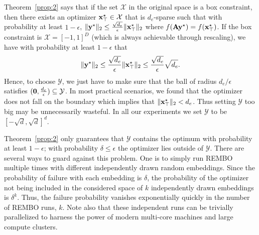 \documentclass{article}
\newcommand{\note}[1]{}
\renewcommand{\note}[1]{~\\\frame{\begin{minipage}[c]{0.48\textwidth}\vspace{2pt}\center{#1}\vspace{2pt}\end{minipage}}\vspace{3pt}\\}
\begin{document}
Theorem~\ref{prop:2} says that if the set $\mathcal{X}$ in the original space is a box constraint, then there exists an optimizer $\mathbf{x}^\star_\top \in \mathcal{X}$ that is $d_e$-sparse such that with probability at least $1-\epsilon$, $\|\mathbf{y}^\star\|_2 \leq \frac{\sqrt{d_e}}{\epsilon}\|\mathbf{x}^{\star}_\top\|_2$ where $f(\mathbf{A}\mathbf{y}^\star) = f(\mathbf{x}^\star_\top)$. If the box constraint is $\mathcal{X} = [-1,1]^D$ (which is always achievable through rescaling), we have with probability at least $1-\epsilon$ that 
\[ \|\mathbf{y}^\star\|_2 \leq \frac{\sqrt{d_e}}{\epsilon}\|\mathbf{x}^{\star}_\top\|_2 \leq \frac{\sqrt{d_e}}{\epsilon}\sqrt{d_e}. \]
Hence, to choose $\mathcal{Y}$, we just have to make sure that the ball of radius $d_e/\epsilon$ satisfies $({\bf 0}, \frac{d_e}{\epsilon} ) \subseteq \mathcal{Y}$. In most practical scenarios, we found that the optimizer does not fall on the boundary which implies that $\|\mathbf{x}^{\star}_\top\|_2 < d_e$. Thus setting $\mathcal{Y}$ too big may be unnecessarily wasteful. In all our experiments we set $\mathcal{Y}$ to be $[-\sqrt{d}, \sqrt{d}]^d$.


Theorem~\ref{prop:2} only guarantees that $\mathcal{Y}$ contains the optimum with probability at least $1-\epsilon$;
with probability $\delta \le \epsilon$ the optimizer lies outside of $\mathcal{Y}$. There are several ways to guard against this problem. One is to simply run REMBO multiple times with different independently drawn random embeddings. 
%
Since the probability of failure with each embedding is $\delta$, 
the probability of the optimizer not being included in the considered space of $k$ independently drawn embeddings is $\delta^k$. 
Thus, the failure probability vanishes exponentially quickly in the number of REMBO runs, $k$. 
Note also that these independent runs can be trivially parallelized to harness the power of
modern multi-core machines and large compute clusters.
%
\end{document}
